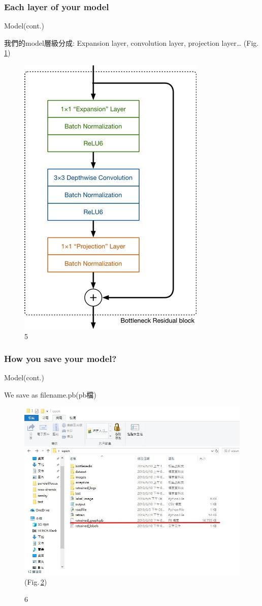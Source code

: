\documentclass{beamer}
\begin{document}
\subsubsection{Each layer of your model }
\begin{frame}{Model(cont.)}
 \begin{CJK}{UTF8}{bkai}
 我們的model層級分成: Expansion layer, convolution layer, projection layer… (Fig.\,\ref{fig:5})
\end{CJK}
  \begin{figure}
    \includegraphics[width=0.3\linewidth]{layer.jpg}
    \caption{5}
    \label{fig:5}
  \end{figure}
\end{frame}

\subsubsection{How you save your model? }
\begin{frame}{Model(cont.)}
  \begin{CJK}{UTF8}{bkai}
	We save as filename.pb(pb檔)
   \end{CJK}
  \begin{figure}
      \includegraphics[width=0.6\linewidth]{pbfile.jpg}(Fig.\,\ref{fig:6})
      \caption{6}
      \label{fig:6}
    \end{figure}
\end{frame}
\end{document}
